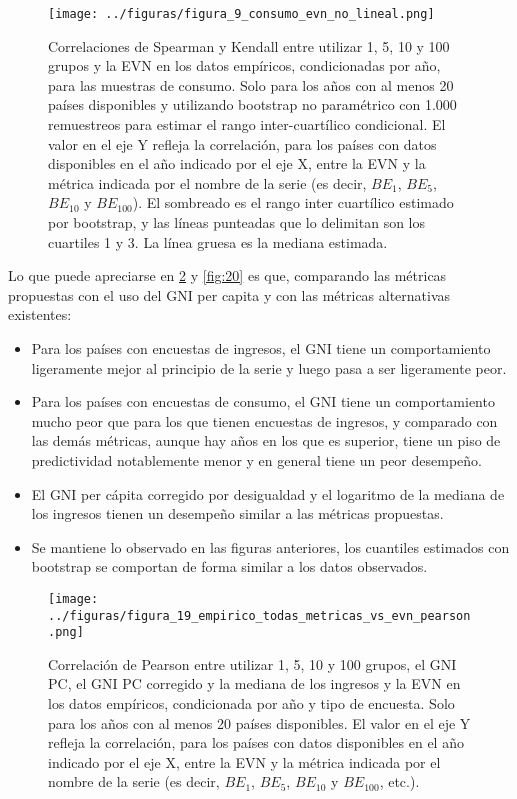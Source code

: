 \begin{figure}[H] %
    \centering %
    \texttt{[image: ../figuras/figura\_9\_consumo\_evn\_no\_lineal.png]} %
    \caption{Correlaciones de Spearman y Kendall entre utilizar 1, 5, 10 y 100 grupos y la EVN en los datos empíricos, condicionadas por año, para las muestras de consumo. Solo para los años con al menos 20 países disponibles y utilizando bootstrap no paramétrico con 1.000 remuestreos para estimar el rango inter-cuartílico condicional. El valor en el eje Y refleja la correlación, para los países con datos disponibles en el año indicado por el eje X, entre la EVN y la métrica indicada por el nombre de la serie (es decir, $BE_1$, $BE_5$, $BE_{10}$ y $BE_{100}$). El sombreado es el rango inter cuartílico estimado por bootstrap, y las líneas punteadas que lo delimitan son los cuartiles 1 y 3. La línea gruesa es la mediana estimada.}
    \label{fig:9} %
\end{figure}

Lo que puede apreciarse en \ref{fig:19} y \ref{fig:20} es que, comparando las métricas propuestas con el uso del GNI per capita y con las métricas alternativas existentes:


\begin{itemize}
    \item  Para los países con encuestas de ingresos, el GNI tiene un comportamiento ligeramente mejor al principio de la serie y luego pasa a ser ligeramente peor.
    \item Para los países con encuestas de consumo, el GNI tiene un comportamiento mucho peor que para los que tienen encuestas de ingresos, y comparado con las demás métricas, aunque hay años en los que es superior, tiene un piso de predictividad notablemente menor y en general tiene un peor desempeño.
    \item El GNI per cápita corregido por desigualdad y el logaritmo de la mediana de los ingresos tienen un desempeño similar a las métricas propuestas.
    \item Se mantiene lo observado en las figuras anteriores, los cuantiles estimados con bootstrap se comportan de forma similar a los datos observados.
\end{itemize}


\begin{figure}[H] %
    \centering %
    \texttt{[image: ../figuras/figura\_19\_empirico\_todas\_metricas\_vs\_evn\_pearson.png]} %
    \caption{Correlación de Pearson entre  utilizar 1, 5, 10 y 100 grupos, el GNI PC, el GNI PC corregido y la mediana de los ingresos y la EVN en los datos empíricos, condicionada por año y tipo de encuesta. Solo para los años con al menos 20 países disponibles. El valor en el eje Y refleja la correlación, para los países con datos disponibles en el año indicado por el eje X, entre la EVN y la métrica indicada por el nombre de la serie (es decir, $BE_1$, $BE_5$, $BE_{10}$ y $BE_{100}$, etc.).
    }
    \label{fig:19} %
\end{figure}

